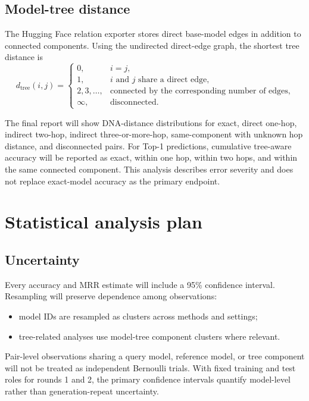 \documentclass[11pt,a4paper]{article}
\begin{document}
\subsection{Model-tree distance}

The Hugging Face relation exporter stores direct base-model edges in addition
to connected components. Using the undirected direct-edge graph, the shortest
tree distance is
\[
  d_{\mathrm{tree}}(i,j)=
  \begin{cases}
    0, & i=j,\\
    1, & i\text{ and }j\text{ share a direct edge},\\
    2,3,\ldots, & \text{connected by the corresponding number of edges},\\
    \infty, & \text{disconnected}.
  \end{cases}
\]

The final report will show DNA-distance distributions for exact, direct
one-hop, indirect two-hop, indirect three-or-more-hop, same-component with
unknown hop distance, and disconnected pairs. For Top-1 predictions, cumulative
tree-aware accuracy will be reported as exact, within one hop, within two hops,
and within the same connected component. This analysis describes error severity
and does not replace exact-model accuracy as the primary endpoint.

\section{Statistical analysis plan}

\subsection{Uncertainty}

Every accuracy and MRR estimate will include a 95\% confidence interval.
Resampling will preserve dependence among observations:

\begin{itemize}
  \item model IDs are resampled as clusters across methods and settings;
  \item tree-related analyses use model-tree component clusters where relevant.
\end{itemize}

Pair-level observations sharing a query model, reference model, or tree
component will not be treated as independent Bernoulli trials. With fixed
training and test roles for rounds 1 and 2, the primary confidence intervals
quantify model-level rather than generation-repeat uncertainty.
\end{document}
